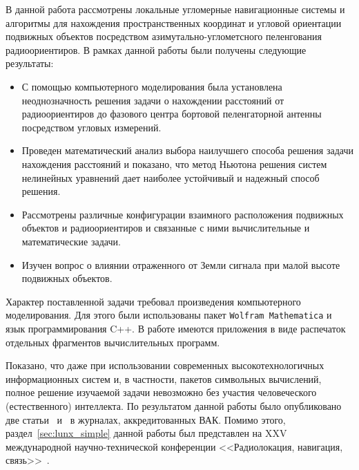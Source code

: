 \documentclass[../main.tex]{subfiles}
\begin{document}
В данной работа рассмотрены локальные угломерные навигационные системы и алгоритмы для нахождения пространственных координат и угловой ориентации подвижных объектов посредством азимутально-углометсного пеленгования радиоориентиров. В рамках данной работы были получены следующие результаты:
\begin{itemize}
    \item С помощью компьютерного моделирования была установлена неоднозначность решения задачи о нахождении расстояний от радиоориентиров до фазового центра бортовой пеленгаторной антенны посредством угловых измерений.
    \item Проведен математический анализ выбора наилучшего способа решения задачи нахождения расстояний и показано, что метод Ньютона решения систем нелинейных уравнений дает наиболее устойчивый и надежный способ решения.
    \item Рассмотрены различные конфигурации взаимного расположения подвижных объектов и радиоориентиров и связанные с ними вычислительные и математические задачи.
    \item Изучен вопрос о влиянии отраженного от Земли сигнала при малой высоте подвижных объектов.
\end{itemize}

Характер поставленной задачи требовал произведения компьютерного моделирования. Для этого были использованы пакет \texttt{Wolfram Mathematica} и язык программирования C++. В работе имеются приложения в виде распечаток отдельных фрагментов вычислительных программ.

Показано, что даже при использовании современных высокотехнологичных информационных систем и, в частности, пакетов символьных вычислений, полное решение изучаемой задачи невозможно без участия человеческого (естественного) интеллекта. По результатом данной работы было опубликовано две статьи~\cite{WMM:2018} и~\cite{WMMU:2019:IIS} в журналах, аккредитованных ВАК. Помимо этого, раздел~\ref{sec:lunx_simple} данной работы был представлен на XXV международной научно-технической конференции  <<Радиолокация, навигация, связь>>~\cite{WMMU:2019:RLNC}.
\end{document}
